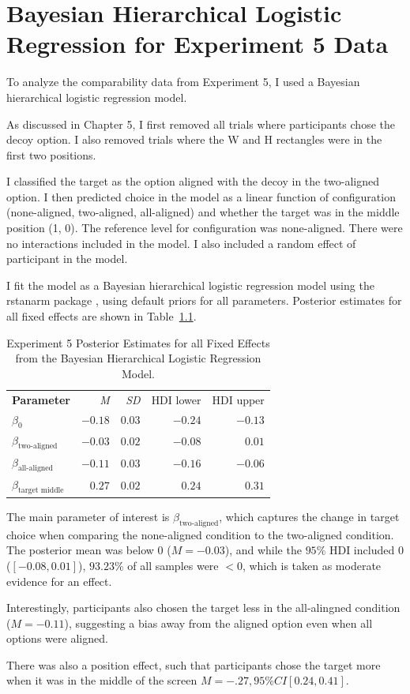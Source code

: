 \chapter{Bayesian Hierarchical Logistic Regression for Experiment 5 Data}

To analyze the comparability data from Experiment 5, I used a Bayesian hierarchical logistic regression model.

As discussed in Chapter 5, I first removed all trials where participants chose the decoy option. I also removed trials where the W and H rectangles were in the first two positions. 

I classified the target as the option aligned with the decoy in the two-aligned option. I then predicted choice in the model as a linear function of configuration (none-aligned, two-aligned, all-aligned) and whether the target was in the middle position (1, 0). The reference level for configuration was none-aligned. There were no interactions included in the model. I also included a random effect of participant in the model. 

I fit the model as a Bayesian hierarchical logistic regression model using the rstanarm package \parencite{rstanarm}, using default priors for all parameters. Posterior estimates for all fixed effects are shown in Table~\ref{tab:e5_logit_params}.

\begin{table}[ht]
    \centering
    \begin{tabular}{lrrrr}
        \toprule
        \textbf{Parameter} & \textit{M} & \textit{SD} & HDI lower & HDI upper \\
        $\beta_{0}$        & $-0.18$    &  $0.03$     & $-0.24$   & $-0.13$   \\
        $\beta_{\text{two-aligned}}$ & $-0.03$ & $0.02$ & $-0.08$ & $0.01$    \\
        $\beta_{\text{all-aligned}}$ & $-0.11$ & $0.03$ & $-0.16$ & $-0.06$   \\
        $\beta_{\text{target middle}}$ & $0.27$ & $0.02$ & $0.24$ & $0.31$    \\
        \bottomrule
    \end{tabular}
    \caption{Experiment 5 Posterior Estimates for all Fixed Effects from the Bayesian Hierarchical Logistic Regression Model.}
    \label{tab:e5_logit_params}
\end{table}

The main parameter of interest is $\beta_{\text{two-aligned}}$, which captures the change in target choice when comparing the none-aligned condition to the two-aligned condition. The posterior mean was below $0$ ($\textit{M}=-0.03$), and while the $95\%$ HDI included 0 ($[-0.08, 0.01]$), $93.23\%$ of all samples were $<0$, which is taken as moderate evidence for an effect. 

Interestingly, participants also chosen the target less in the all-alingned condition ($\textit{M}=-0.11$), suggesting a bias away from the aligned option even when all options were aligned. 

There was also a position effect, such that participants chose the target more when it was in the middle of the screen $\textit{M}=-.27, 95\%CI[0.24,0.41]$. 